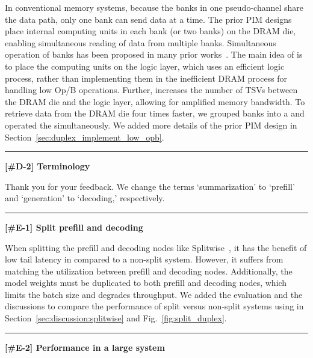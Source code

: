 In conventional memory systems, because the banks in one pseudo-channel share the data path, only one bank can send data at a time. 
The prior PIM designs place internal computing units in each bank (or two banks) on the DRAM die, enabling simultaneous reading of data from multiple banks.
Simultaneous operation of banks has been proposed in many prior works~\cite{isca-2021-hbm-pim, isscc-2022-aim, asplos-2024-attacc, asplos-2024-neupim}. 
The main idea of \duplex is to place the computing units on the logic layer, which uses an efficient logic process, rather than implementing them in the inefficient DRAM process for handling low Op/B operations. 
Further, \duplex increases the number of TSVs between the DRAM die and the logic layer, allowing for amplified memory bandwidth.
To retrieve data from the DRAM die four times faster, we grouped banks into a \bankbundle and operated the \bankbundle simultaneously.
We added more details of the prior PIM design in Section~\ref{sec:duplex_implement_low_opb}.

\noindent
\rule[0.5ex]{8.8cm}{0.5pt}

\noindent
\textbf{[\#D-2] Terminology}
%

Thank you for your feedback. We change the terms `summarization' to `prefill' and `generation' to `decoding,' respectively.


\noindent
\rule[0.5ex]{8.8cm}{0.5pt}

\noindent
\textbf{[\#E-1] Split prefill and decoding}
%

When splitting the prefill and decoding nodes like Splitwise~\cite{arxiv-2024-splitwise}, it has the benefit of low tail latency in \tbt compared to a non-split system.
However, it suffers from matching the utilization between prefill and decoding nodes.
Additionally, the model weights must be duplicated to both prefill and decoding nodes, which limits the batch size and degrades throughput.
We added the evaluation and the discussions to compare the performance of split versus non-split systems using \duplex in Section~\ref{sec:discussion:splitwise} and Fig.~\ref{fig:split_duplex}.


\noindent
\rule[0.5ex]{8.8cm}{0.5pt}

\noindent
\textbf{[\#E-2] Performance in a large system}
%

